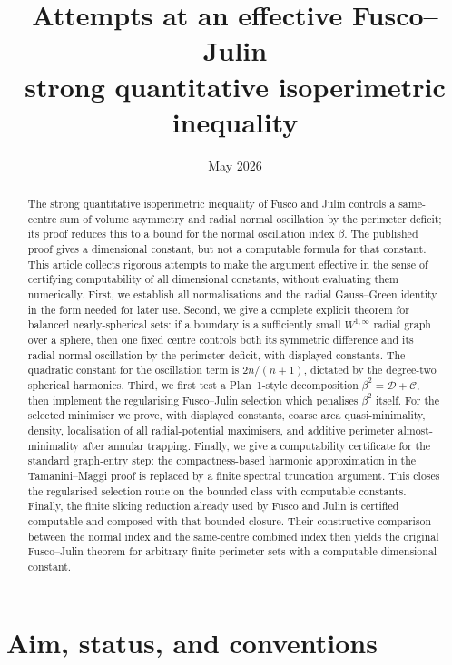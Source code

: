\documentclass[11pt]{amsart}
\title[Attempts at an effective Fusco--Julin inequality]
{Attempts at an effective Fusco--Julin\\
strong quantitative isoperimetric inequality}
\author{}
\date{May 2026}
\theoremstyle{definition}
\begin{document}
\begin{abstract}
The strong quantitative isoperimetric inequality of Fusco and Julin controls
a same-centre sum of volume asymmetry and radial normal oscillation by the
perimeter deficit; its proof reduces this to a bound for the normal
oscillation index \(\beta\).  The published proof gives a dimensional constant, but not a
computable formula for that constant.  This article collects rigorous attempts
to make the argument effective in the sense of certifying computability of
all dimensional constants, without evaluating them numerically.  First, we establish all normalisations and
the radial Gauss--Green identity in the form needed for later use.  Second, we
give a complete explicit theorem for balanced nearly-spherical sets: if a
boundary is a sufficiently small \(W^{1,\infty}\) radial graph over a sphere,
then one fixed centre controls both its symmetric difference and its radial
normal oscillation by the perimeter deficit, with displayed constants.  The
quadratic constant for the oscillation term is \(2n/(n+1)\), dictated by the
degree-two spherical harmonics.  Third, we first test a Plan~1-style
decomposition \(\beta^2=\mathcal D+\mathcal C\), then implement the
regularising Fusco--Julin selection which penalises \(\beta^2\) itself.  For
the selected minimiser we prove, with displayed constants, coarse area
quasi-minimality, density, localisation of all radial-potential maximisers,
and additive perimeter almost-minimality after annular trapping.  Finally, we
give a computability certificate for the standard graph-entry step: the
compactness-based harmonic approximation in the Tamanini--Maggi proof is
replaced by a finite spectral truncation argument.  This closes the
regularised selection route on the bounded class with computable
constants.  Finally, the finite slicing reduction already used by Fusco and
Julin is certified computable and composed with that bounded closure.  Their
constructive comparison between the normal index and the same-centre combined
index then yields the original Fusco--Julin theorem for arbitrary
finite-perimeter sets with a computable dimensional constant.
\end{abstract}

\maketitle
\tableofcontents

\section{Aim, status, and conventions}\label{sec:intro}
\end{document}
